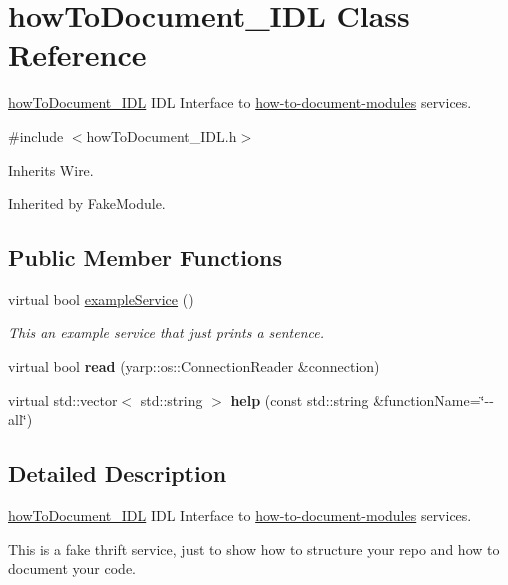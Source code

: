\section{how\+To\+Document\+\_\+\+I\+DL Class Reference}
\label{classhowToDocument__IDL}


\hyperlink{classhowToDocument__IDL}{how\+To\+Document\+\_\+\+I\+DL} I\+DL Interface to \hyperlink{group__how-to-document-modules}{how-\/to-\/document-\/modules} services.  




{\ttfamily \#include $<$how\+To\+Document\+\_\+\+I\+D\+L.\+h$>$}



Inherits Wire.



Inherited by Fake\+Module.

\subsection*{Public Member Functions}
\begin{DoxyCompactItemize}
\item 
virtual bool \hyperlink{classhowToDocument__IDL_a530964d66092c8ddbcfb194d7d89b733}{example\+Service} ()
\begin{DoxyCompactList}\small\item\em This an example service that just prints a sentence. \end{DoxyCompactList}\item 
\mbox{\label{classhowToDocument__IDL_a411a8a318dcff4b8507f371d3f66fbf7}} 
virtual bool {\bfseries read} (yarp\+::os\+::\+Connection\+Reader \&connection)
\item 
\mbox{\label{classhowToDocument__IDL_af9391f5fdb4547d3e1404b1b44dba42e}} 
virtual std\+::vector$<$ std\+::string $>$ {\bfseries help} (const std\+::string \&function\+Name=\char`\"{}-\/-\/all\char`\"{})
\end{DoxyCompactItemize}


\subsection{Detailed Description}
\hyperlink{classhowToDocument__IDL}{how\+To\+Document\+\_\+\+I\+DL} I\+DL Interface to \hyperlink{group__how-to-document-modules}{how-\/to-\/document-\/modules} services. 

This is a fake thrift service, just to show how to structure your repo and how to document your code. 

